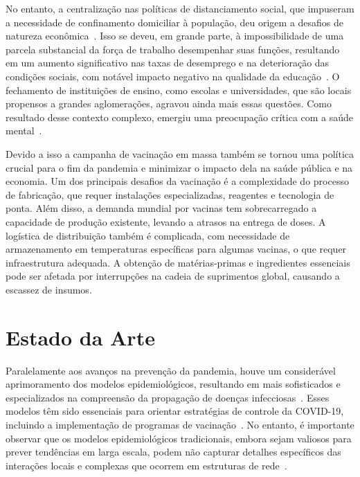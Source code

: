 No entanto, a centralização nas políticas de distanciamento social, que impuseram a necessidade de confinamento domiciliar à população, deu origem a desafios de natureza econômica~\cite{Irawan2021}. Isso se deveu, em grande parte, à impossibilidade de uma parcela substancial da força de trabalho desempenhar suas funções, resultando em um aumento significativo nas taxas de desemprego e na deterioração das condições sociais, com notável impacto negativo na qualidade da educação~\cite{10.1371/journal.pone.0239490}. O fechamento de instituições de ensino, como escolas e universidades, que são locais propensos a grandes aglomerações, agravou ainda mais essas questões. Como resultado desse contexto complexo, emergiu uma preocupação crítica com a saúde mental~\cite{Pereira2020}.


Devido a isso a campanha de vacinação em massa também se tornou uma política crucial para o fim da pandemia e minimizar 
o impacto dela 
na saúde pública e na economia. Um dos principais desafios da vacinação é a complexidade do processo de fabricação, que requer instalações especializadas, reagentes e tecnologia de ponta. Além disso, a demanda mundial por vacinas tem sobrecarregado a capacidade de produção existente, levando a atrasos na entrega de doses. A logística de distribuição também é complicada, com necessidade de armazenamento em temperaturas específicas para algumas vacinas, o que requer infraestrutura adequada. A obtenção de matérias-primas e ingredientes essenciais pode ser afetada por interrupções na cadeia de suprimentos global, causando a escassez de insumos.

\section{Estado da Arte}

Paralelamente aos avanços na prevenção da pandemia, houve um considerável aprimoramento dos modelos epidemiológicos, resultando em mais sofisticados e especializados na compreensão da propagação de doenças infecciosas~\cite{Xiang2021}. Esses modelos têm sido essenciais para orientar estratégias de controle da COVID-19, incluindo a implementação de programas de vacinação~\cite{Scabini2021, BustamanteCastaeda2021, Loyal2020}. No entanto, é importante observar que os modelos epidemiológicos tradicionais, embora sejam valiosos para prever tendências em larga escala, podem não capturar detalhes específicos das interações locais e complexas que ocorrem em estruturas de rede~\cite{Pellis2015}.

